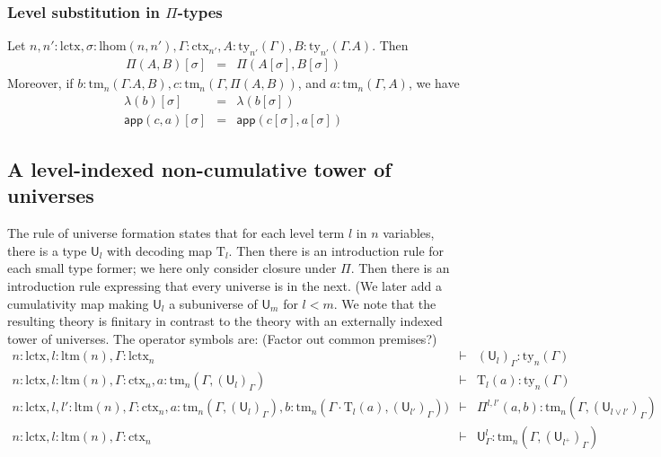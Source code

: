 \documentclass[11pt,a4paper]{article}
\theoremstyle{definition}
\newcommand{\UU}{\mathsf{U}}
\newcommand{\app}[2]{{#1\,#2}} %
\def\lhom{\mathrm{lhom}}
\def\UU{\mathsf{U}}
\newcommand{\N}{\mathsf{N}}
\def\Pihat{\Pi}
\def\lctx{\mathrm{lctx}}
\def\ltm{\mathrm{ltm}}
\newcommand{\ctx}{\mathrm{ctx}}
\newcommand{\ty}{\mathrm{ty}}
\newcommand{\tm}{\mathrm{tm}}
\def\app{\mathsf{app}}
\def\U{\mathsf{U}}
\newcommand{\Ta}{\mathrm{T}}
\begin{document}


\subsubsection{Level substitution in $\Pi$-types}

Let $n, n' : \lctx , \sigma : \lhom(n,n'), \Gamma : \ctx_{n'}, A:\ty_{n'}(\Gamma), B:\ty_{n'}(\Gamma.A)$. Then
\begin{eqnarray*}
\Pi(A,B)[\sigma] &=& \Pi(A[\sigma],B[\sigma])
\end{eqnarray*}
Moreover, if $b : \tm_n(\Gamma.A,B), c :  \tm_n(\Gamma,\Pi(A,B))$,  and $a : \tm_n(\Gamma,A)$, we have
\begin{eqnarray*}
\lambda(b)[\sigma] &=&\lambda(b[\sigma])\\
\app(c,a)[\sigma] &=&\app(c[\sigma],a[\sigma])
\end{eqnarray*}

\subsection{A level-indexed non-cumulative tower of universes}

The rule of universe formation states that for each level term $l$ in $n$ variables, there is a type $\UU_l$ with decoding map $\Ta_l$. Then there is an introduction rule for each small type former; we here only consider closure under $\Pi$. Then there is an introduction rule expressing that every universe is in the next. (We later add  a cumulativity map making $\U_l$ a subuniverse of $\UU_m$ for $l < m$. We note that the resulting theory is finitary in contrast to the theory with an externally indexed tower of universes.
The operator symbols are: (Factor out common premises?)
\begin{eqnarray*}
n : \lctx, l : \ltm(n), \Gamma : \lctx_n &\vdash& (\U_{l})_\Gamma : \ty_n(\Gamma)\\
n : \lctx, l : \ltm(n), \Gamma : \ctx_n, a : \tm_n(\Gamma,(\U_{l})_\Gamma) &\vdash& {\Ta_{l}}(a) : \ty_n(\Gamma)\\
n : \lctx, l, l' : \ltm(n), \Gamma : \ctx_n,
a : \tm_n(\Gamma,(\U_{l})_\Gamma),
b :  \tm_n(\Gamma \cdot \Ta_{l}(a), (\U_{l'})_\Gamma))
&\vdash&
 \Pihat^{l,l'}(a,b) : \tm_n(\Gamma,(\U_{l \vee l'})_\Gamma)\\
 n : \lctx, l : \ltm(n),\Gamma : \ctx_n&\vdash&\UU^l_\Gamma: \tm_n(\Gamma,(\UU_{l^+})_\Gamma)
\end{eqnarray*}
\end{document}
